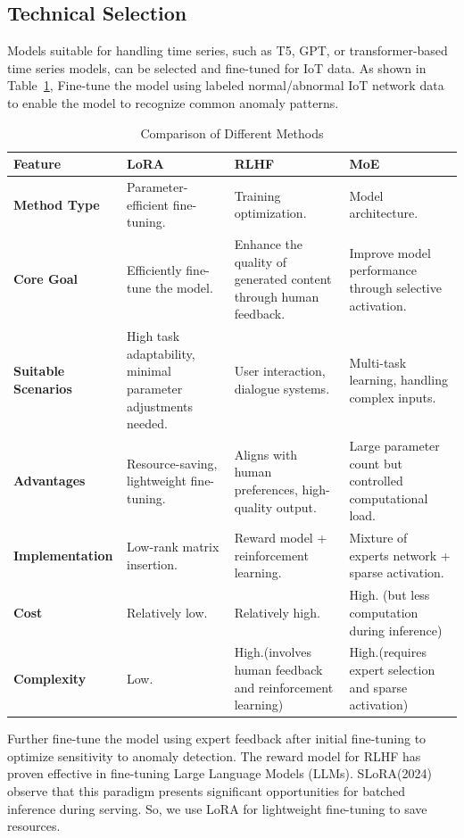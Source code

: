 \documentclass[usenatbib]{tjaa}
\begin{document}
\subsection{Technical Selection}

Models suitable for handling time series, such as T5, GPT,
or transformer-based time series models,
can be selected and fine-tuned for IoT data.
As shown in Table~\ref{tab:comparison}, Fine-tune the model using labeled normal/abnormal
IoT network data to enable the model to recognize common anomaly patterns.

\begin{table}
  \centering
  \caption{Comparison of Different Methods}
  \label{tab:comparison}
  \begin{tabularx}{\textwidth}{>{\raggedright\arraybackslash}p{2.5cm} X X X}
      \toprule
      \textbf{Feature} & \textbf{LoRA} & \textbf{RLHF} & \textbf{MoE} \\
      \midrule
      \textbf{Method Type} & Parameter-efficient fine-tuning. & Training optimization. & Model architecture. \\
      \textbf{Core Goal} & Efficiently fine-tune the model. & Enhance the quality of generated content through human feedback. & Improve model performance through selective activation. \\
      \textbf{Suitable Scenarios} & High task adaptability, minimal parameter adjustments needed. & User interaction, dialogue systems. & Multi-task learning, handling complex inputs. \\
      \textbf{Advantages} & Resource-saving, lightweight fine-tuning. & Aligns with human preferences, high-quality output. & Large parameter count but controlled computational load. \\
      \textbf{Implementation} & Low-rank matrix insertion. & Reward model + reinforcement learning. & Mixture of experts network + sparse activation. \\
      \textbf{Cost} & Relatively low. & Relatively high. & High. (but less computation during inference) \\
      \textbf{Complexity} & Low. & High.(involves human feedback and reinforcement learning) & High.(requires expert selection and sparse activation) \\
      \bottomrule
  \end{tabularx}
\end{table}

Further fine-tune the model using expert feedback after initial fine-tuning to optimize sensitivity to anomaly detection.
The reward model for RLHF has proven effective in fine-tuning Large Language Models
(LLMs)\citep{zhang2024prototypical}.
SLoRA(2024) observe that this paradigm presents significant opportunities
for batched inference during serving\citep{sheng2024slora}.
So, we use LoRA for lightweight fine-tuning to save resources.
\end{document}
